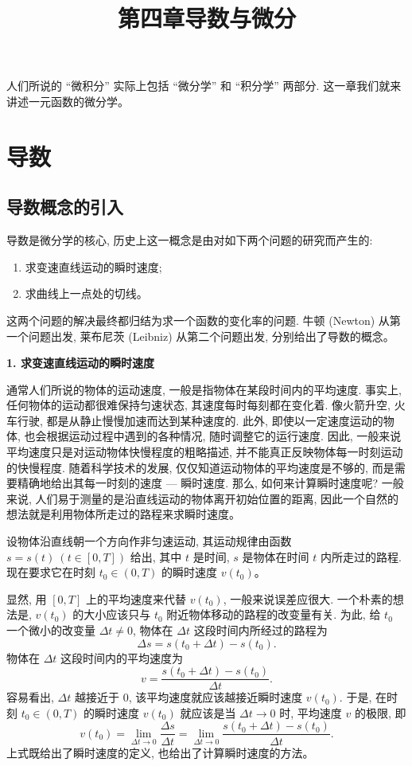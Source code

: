 \documentclass[UTF8,12pt,a4paper,fontset=fandol]{ctexart}
\title{第四章\quad 导数与微分}
\author{}
\date{}
\begin{document}
\maketitle

人们所说的 ``微积分'' 实际上包括 ``微分学'' 和 ``积分学'' 两部分. 这一章我们就来讲述一元函数的微分学。

\section{导数}

\subsection{导数概念的引入}

导数是微分学的核心, 历史上这一概念是由对如下两个问题的研究而产生的:
\begin{enumerate}
  \item 求变速直线运动的瞬时速度;
  \item 求曲线上一点处的切线。
\end{enumerate}
这两个问题的解决最终都归结为求一个函数的变化率的问题. 牛顿 (Newton) 从第一个问题出发, 莱布尼茨 (Leibniz) 从第二个问题出发, 分别给出了导数的概念。

\noindent\textbf{1. 求变速直线运动的瞬时速度}

通常人们所说的物体的运动速度, 一般是指物体在某段时间内的平均速度. 事实上, 任何物体的运动都很难保持匀速状态, 其速度每时每刻都在变化着. 像火箭升空, 火车行驶, 都是从静止慢慢加速而达到某种速度的. 此外, 即使以一定速度运动的物体, 也会根据运动过程中遇到的各种情况, 随时调整它的运行速度. 因此, 一般来说平均速度只是对运动物体快慢程度的粗略描述, 并不能真正反映物体每一时刻运动的快慢程度. 随着科学技术的发展, 仅仅知道运动物体的平均速度是不够的, 而是需要精确地给出其每一时刻的速度 --- 瞬时速度. 那么, 如何来计算瞬时速度呢? 一般来说, 人们易于测量的是沿直线运动的物体离开初始位置的距离, 因此一个自然的想法就是利用物体所走过的路程来求瞬时速度。

设物体沿直线朝一个方向作非匀速运动, 其运动规律由函数 $s=s(t)\ (t\in[0,T])$ 给出, 其中 $t$ 是时间, $s$ 是物体在时间 $t$ 内所走过的路程. 现在要求它在时刻 $t_0\in(0,T)$ 的瞬时速度 $v(t_0)$。

显然, 用 $[0,T]$ 上的平均速度来代替 $v(t_0)$, 一般来说误差应很大. 一个朴素的想法是, $v(t_0)$ 的大小应该只与 $t_0$ 附近物体移动的路程的改变量有关. 为此, 给 $t_0$ 一个微小的改变量 $\Delta t\ne0$, 物体在 $\Delta t$ 这段时间内所经过的路程为
\[
  \Delta s=s(t_0+\Delta t)-s(t_0).
\]
物体在 $\Delta t$ 这段时间内的平均速度为
\[
  v=\frac{s(t_0+\Delta t)-s(t_0)}{\Delta t}.
\]
容易看出, $\Delta t$ 越接近于 $0$, 该平均速度就应该越接近瞬时速度 $v(t_0)$. 于是, 在时刻 $t_0\in(0,T)$ 的瞬时速度 $v(t_0)$ 就应该是当 $\Delta t\to0$ 时, 平均速度 $v$ 的极限, 即
\[
  v(t_0)
  =
  \lim_{\Delta t\to0}\frac{\Delta s}{\Delta t}
  =
  \lim_{\Delta t\to0}
  \frac{s(t_0+\Delta t)-s(t_0)}{\Delta t}.
\]
上式既给出了瞬时速度的定义, 也给出了计算瞬时速度的方法。
\end{document}
